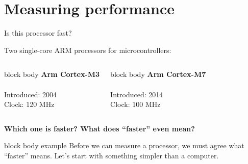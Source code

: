 \documentclass[aspectratio=169,10pt]{beamer}
\newcommand{\keymsg}[1]{%
  \begin{beamercolorbox}[rounded=true,sep=0.1cm,wd=\textwidth]{block body example}
    \centering\footnotesize #1
  \end{beamercolorbox}}
\begin{document}
\section{Measuring performance}

\begin{frame}{Is this processor fast?}
  \begin{center}
    \small Two single-core ARM processors for microcontrollers:
  \end{center}
  \vspace{0.1cm}
  \begin{columns}[T,onlytextwidth]
      \begin{beamercolorbox}[rounded=true,sep=0.16cm,wd=\linewidth]{block body}
        \centering\large\textbf{Arm Cortex-M3}\\[0.15cm]
        {\Huge\textcolor{DeepBlue}{\faMicrochip}}\\[0.15cm]
        \normalsize Introduced: 2004\\ Clock: 120 MHz
      \end{beamercolorbox}
      \begin{beamercolorbox}[rounded=true,sep=0.16cm,wd=\linewidth]{block body}
        \centering\large\textbf{Arm Cortex-M7}\\[0.15cm]
        {\Huge\textcolor{DeepBlue}{\faMicrochip}}\\[0.15cm]
        \normalsize Introduced: 2014\\ Clock: 100 MHz
      \end{beamercolorbox}
  \end{columns}
  \vspace{0.35cm}
  \begin{center}
    \Large\textbf{Which one is faster? What does ``faster'' even mean?}
  \end{center}
  \vfill
  \keymsg{Before we can measure a processor, we must agree what ``faster'' means.
    Let's start with something simpler than a computer.}
\end{frame}
\end{document}
